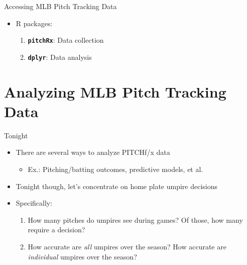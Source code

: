 \begin{frame}[fragile]{Accessing MLB Pitch Tracking Data}

\begin{itemize}
\tightlist
\item
  R packages:

  \begin{enumerate}
  \def\labelenumi{\arabic{enumi}.}
  \tightlist
  \item
    \textbf{\texttt{pitchRx}}: Data collection
  \item
    \textbf{\texttt{dplyr}}: Data analysis
  \end{enumerate}
\end{itemize}

\end{frame}

\section{Analyzing MLB Pitch Tracking
Data}\label{analyzing-mlb-pitch-tracking-data}

\begin{frame}{Tonight}

\begin{itemize}
\tightlist
\item
  There are several ways to analyze PITCHf/x data

  \begin{itemize}
  \tightlist
  \item
    Ex.: Pitching/batting outcomes, predictive models, et al.
  \end{itemize}
\item
  Tonight though, let's concentrate on home plate umpire decisions
\item
  Specifically:

  \begin{enumerate}
  \def\labelenumi{\arabic{enumi}.}
  \tightlist
  \item
    How many pitches do umpires see during games? Of those, how many
    require a decision?
  \item
    How accurate are \emph{all} umpires over the season? How accurate
    are \emph{individual} umpires over the season?
  \end{enumerate}
\end{itemize}

\end{frame}

